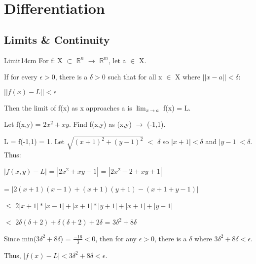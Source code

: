 \newpage

\section[Day 2: Differentiation]{ Differentiation }

\subsection{ Limits \& Continuity }

    \begin{definition}{Limit}{14cm}
        For f: X $\subset$ $\mathbb{R}^n$ $\rightarrow$ $\mathbb{R}^m$,
        let a $\in$ X.

        If for every $\epsilon > 0$, there is a $\delta > 0$ such that
        for all x $\in$ X where $||x-a|| < \delta$:

        \hspace{0.5cm}
        $||f(x) - L|| < \epsilon$

        Then the {\color{lblue} limit} of f(x) as x approaches a is
        $\lim_{x \rightarrow a}$ f(x) = L.
    \end{definition}

    \vspace{0.5cm}



    \begin{example}
        Let f(x,y) = $2x^2 + xy$. Find f(x,y) as (x,y) $\rightarrow$ (-1,1).
    \end{example}

    \begin{tbox}
        L = f(-1,1) = 1.
        Let $\sqrt{(x+1)^2 + (y-1)^2}$ $<$ $\delta$
        so $|x+1| < \delta$ and $|y-1| < \delta$. Thus:

        \hspace{0.5cm}
        $|f(x,y) - L|$
        = $|2x^2 + xy - 1|$
        = $|2x^2-2 + xy+1|$

        \hspace{2.85cm}
        = $|2(x+1)(x-1) + (x+1)(y+1)-(x+1+y-1)|$
        
        \hspace{2.85cm}
        $\leq$ $2|x+1|*|x-1| + |x+1|*|y+1| + |x+1| + |y-1|$

        \hspace{2.85cm}
        $<$ $2\delta(\delta+2) + \delta(\delta + 2) + 2\delta$
        = $3\delta^2 + 8\delta$

        Since min($3\delta^2 + 8\delta$) = $\frac{-16}{3} < 0$, then
        for any $\epsilon > 0$, there is a $\delta$ where
        $3\delta^2 + 8\delta < \epsilon$.
        
        Thus, $|f(x) - L| < 3\delta^2 + 8\delta < \epsilon$.
    \end{tbox}

